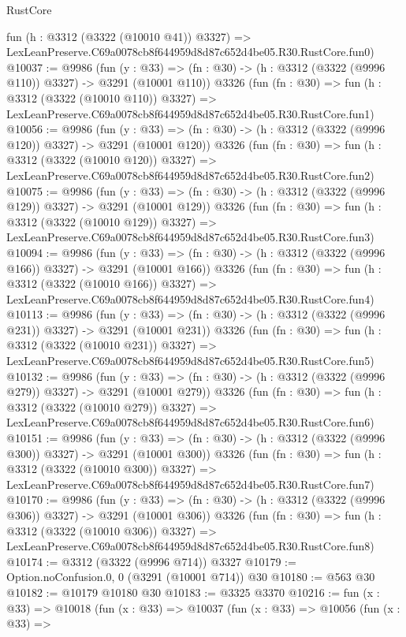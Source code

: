 \begin{lexlean}{RustCore}
\begin{coremodule}
    fun (h : @3312 (@3322 (@10010 @41)) @3327) =>
    LexLeanPreserve.C69a0078cb8f644959d8d87c652d4be05.R30.RustCore.fun0)
@10037 := @9986
    (fun (y : @33) => (fn : @30) -> (h : @3312 (@3322 (@9996 @110)) @3327) -> @3291 (@10001 @110))
    @3326
    (fun (fn : @30) =>
    fun (h : @3312 (@3322 (@10010 @110)) @3327) =>
    LexLeanPreserve.C69a0078cb8f644959d8d87c652d4be05.R30.RustCore.fun1)
@10056 := @9986
    (fun (y : @33) => (fn : @30) -> (h : @3312 (@3322 (@9996 @120)) @3327) -> @3291 (@10001 @120))
    @3326
    (fun (fn : @30) =>
    fun (h : @3312 (@3322 (@10010 @120)) @3327) =>
    LexLeanPreserve.C69a0078cb8f644959d8d87c652d4be05.R30.RustCore.fun2)
@10075 := @9986
    (fun (y : @33) => (fn : @30) -> (h : @3312 (@3322 (@9996 @129)) @3327) -> @3291 (@10001 @129))
    @3326
    (fun (fn : @30) =>
    fun (h : @3312 (@3322 (@10010 @129)) @3327) =>
    LexLeanPreserve.C69a0078cb8f644959d8d87c652d4be05.R30.RustCore.fun3)
@10094 := @9986
    (fun (y : @33) => (fn : @30) -> (h : @3312 (@3322 (@9996 @166)) @3327) -> @3291 (@10001 @166))
    @3326
    (fun (fn : @30) =>
    fun (h : @3312 (@3322 (@10010 @166)) @3327) =>
    LexLeanPreserve.C69a0078cb8f644959d8d87c652d4be05.R30.RustCore.fun4)
@10113 := @9986
    (fun (y : @33) => (fn : @30) -> (h : @3312 (@3322 (@9996 @231)) @3327) -> @3291 (@10001 @231))
    @3326
    (fun (fn : @30) =>
    fun (h : @3312 (@3322 (@10010 @231)) @3327) =>
    LexLeanPreserve.C69a0078cb8f644959d8d87c652d4be05.R30.RustCore.fun5)
@10132 := @9986
    (fun (y : @33) => (fn : @30) -> (h : @3312 (@3322 (@9996 @279)) @3327) -> @3291 (@10001 @279))
    @3326
    (fun (fn : @30) =>
    fun (h : @3312 (@3322 (@10010 @279)) @3327) =>
    LexLeanPreserve.C69a0078cb8f644959d8d87c652d4be05.R30.RustCore.fun6)
@10151 := @9986
    (fun (y : @33) => (fn : @30) -> (h : @3312 (@3322 (@9996 @300)) @3327) -> @3291 (@10001 @300))
    @3326
    (fun (fn : @30) =>
    fun (h : @3312 (@3322 (@10010 @300)) @3327) =>
    LexLeanPreserve.C69a0078cb8f644959d8d87c652d4be05.R30.RustCore.fun7)
@10170 := @9986
    (fun (y : @33) => (fn : @30) -> (h : @3312 (@3322 (@9996 @306)) @3327) -> @3291 (@10001 @306))
    @3326
    (fun (fn : @30) =>
    fun (h : @3312 (@3322 (@10010 @306)) @3327) =>
    LexLeanPreserve.C69a0078cb8f644959d8d87c652d4be05.R30.RustCore.fun8)
@10174 := @3312 (@3322 (@9996 @714)) @3327
@10179 := Option.noConfusion.{0, 0} (@3291 (@10001 @714)) @30
@10180 := @563 @30
@10182 := @10179 @10180 @30
@10183 := @3325 @3370
@10216 := fun (x : @33) =>
  @10018
    (fun (x : @33) =>
    @10037
      (fun (x : @33) =>
      @10056
        (fun (x : @33) =>

\end{coremodule}
\end{lexlean}
